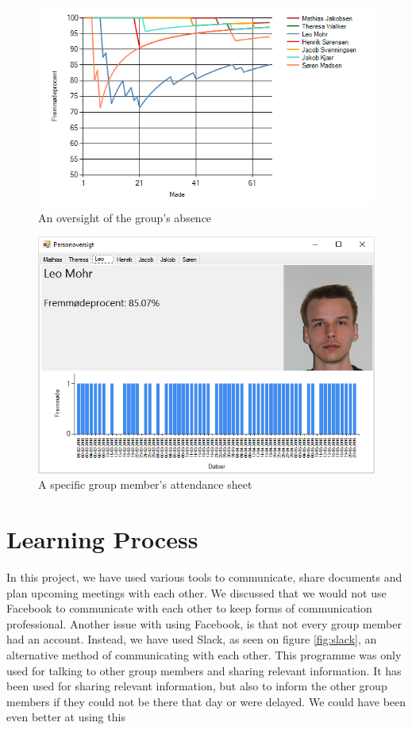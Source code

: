 \documentclass{article}
\begin{document}
\begin{figure}
	\centering
	\includegraphics[width=1\textwidth]{figures/GraphImage.png}
	\caption{An oversight of the group's absence}
	\label{fig:GraphImage}
\end{figure}

\begin{figure}
	\centering
	\includegraphics[width=1\textwidth]{figures/soerenfravaer.png}
	\caption{A specific group member's attendance sheet}
	\label{fig:soerenfravaer}
\end{figure}

\section{Learning Process}
In this project, we have used various tools to communicate, share documents and plan upcoming meetings with each other. 
We discussed that we would not use Facebook to communicate with each other to keep forms of communication professional. Another issue with using Facebook, is that not every group member had an account.
Instead, we have used Slack, as seen on figure \ref{fig:slack}, an alternative method of communicating with each other. 
This programme was only used for talking to other group members and sharing relevant information. 
It has been used for sharing relevant information, but also to inform the other group members if they could not be there that day or were delayed. 
We could have been even better at using this
\end{document}
